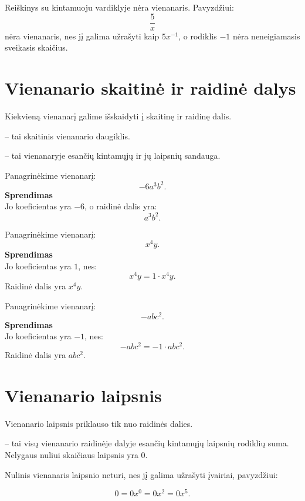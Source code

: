 \documentclass[11pt,a4paper]{scrartcl}
\begin{document}
\begin{remark}
Reiškinys su kintamuoju vardiklyje nėra vienanaris. Pavyzdžiui:
\[
\frac{5}{x}
\]
nėra vienanaris, nes jį galima užrašyti kaip $5x^{-1}$, o rodiklis $-1$ nėra neneigiamasis sveikasis skaičius.
\end{remark}

\section{Vienanario skaitinė ir raidinė dalys}

Kiekvieną vienanarį galime išskaidyti į skaitinę ir raidinę dalis.

\begin{definition}
 -- tai skaitinis vienanario daugiklis.
\end{definition}

\begin{definition}
 -- tai vienanaryje esančių kintamųjų ir jų laipsnių sandauga.
\end{definition}

\begin{example}
Panagrinėkime vienanarį:
\[
-6a^3b^2.
\]
\textbf{Sprendimas}\\
Jo koeficientas yra $-6$, o raidinė dalis yra:
\[
a^3b^2.
\]
\end{example}

\begin{example}
Panagrinėkime vienanarį:
\[
x^4y.
\]
\textbf{Sprendimas}\\
Jo koeficientas yra $1$, nes:
\[
x^4y=1 \cdot x^4y.
\]
Raidinė dalis yra $x^4y$.
\end{example}

\begin{example}
Panagrinėkime vienanarį:
\[
-abc^2.
\]
\textbf{Sprendimas}\\
Jo koeficientas yra $-1$, nes:
\[
-abc^2=-1 \cdot abc^2.
\]
Raidinė dalis yra $abc^2$.
\end{example}

\section{Vienanario laipsnis}

Vienanario laipsnis priklauso tik nuo raidinės dalies.

\begin{definition}
 -- tai visų vienanario raidinėje dalyje esančių kintamųjų laipsnių rodiklių suma.
Nelygaus nuliui skaičiaus laipsnis yra $0$.

Nulinis vienanaris laipsnio neturi, nes jį galima užrašyti įvairiai, pavyzdžiui:

\[
0=0x^0=0x^2=0x^5.
\]
\end{definition}
\end{document}
